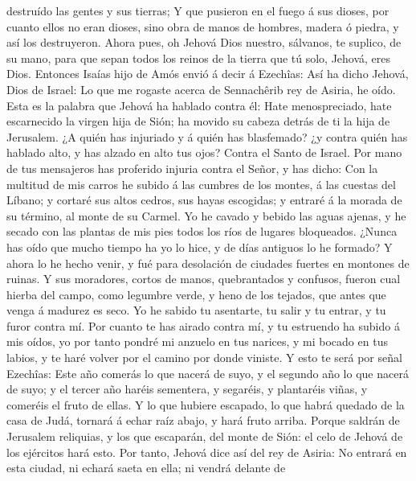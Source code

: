 destruído las gentes y sus tierras;  Y que pusieron en el
fuego á sus dioses, por cuanto ellos no eran dioses, sino obra de manos
de hombres, madera ó piedra, y así los destruyeron. 
Ahora pues, oh Jehová Dios nuestro, sálvanos, te suplico, de su mano,
para que sepan todos los reinos de la tierra que tú solo, Jehová, eres
Dios.  Entonces Isaías hijo de Amós envió á decir á
Ezechîas: Así ha dicho Jehová, Dios de Israel: Lo que me rogaste acerca
de Sennachêrib rey de Asiria, he oído.  Esta es la
palabra que Jehová ha hablado contra él: Hate menospreciado, hate
escarnecido la virgen hija de Sión; ha movido su cabeza detrás de ti la
hija de Jerusalem.  ¿A quién has injuriado y á quién has
blasfemado? ¿y contra quién has hablado alto, y has alzado en alto tus
ojos? Contra el Santo de Israel.  Por mano de tus
mensajeros has proferido injuria contra el Señor, y has dicho: Con la
multitud de mis carros he subido á las cumbres de los montes, á las
cuestas del Líbano; y cortaré sus altos cedros, sus hayas escogidas; y
entraré á la morada de su término, al monte de su Carmel.
 Yo he cavado y bebido las aguas ajenas, y he secado con
las plantas de mis pies todos los ríos de lugares bloqueados.
 ¿Nunca has oído que mucho tiempo ha yo lo hice, y de
días antiguos lo he formado? Y ahora lo he hecho venir, y fué para
desolación de ciudades fuertes en montones de ruinas.  Y
sus moradores, cortos de manos, quebrantados y confusos, fueron cual
hierba del campo, como legumbre verde, y heno de los tejados, que antes
que venga á madurez es seco.  Yo he sabido tu asentarte,
tu salir y tu entrar, y tu furor contra mí.  Por cuanto
te has airado contra mí, y tu estruendo ha subido á mis oídos, yo por
tanto pondré mi anzuelo en tus narices, y mi bocado en tus labios, y te
haré volver por el camino por donde viniste.  Y esto te
será por señal Ezechîas: Este año comerás lo que nacerá de suyo, y el
segundo año lo que nacerá de suyo; y el tercer año haréis sementera, y
segaréis, y plantaréis viñas, y comeréis el fruto de ellas.
 Y lo que hubiere escapado, lo que habrá quedado de la
casa de Judá, tornará á echar raíz abajo, y hará fruto arriba.
 Porque saldrán de Jerusalem reliquias, y los que
escaparán, del monte de Sión: el celo de Jehová de los ejércitos hará
esto.  Por tanto, Jehová dice así del rey de Asiria: No
entrará en esta ciudad, ni echará saeta en ella; ni vendrá delante de
